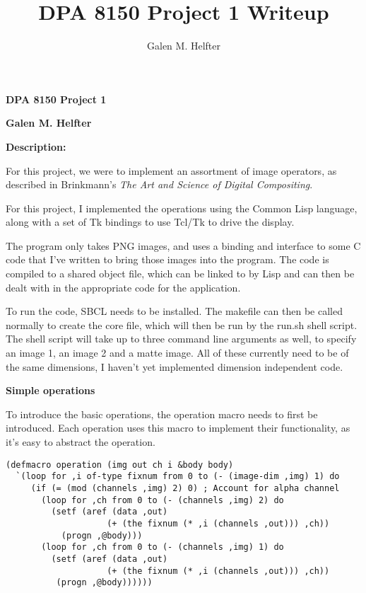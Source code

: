 \documentclass[11pt]{report}
\begin{document}
\title{DPA 8150 Project 1 Writeup}
\author{Galen M. Helfter\\
       }



\centerline{\textbf{DPA 8150 Project 1}}
\centerline{\textbf{Galen M. Helfter}}

\bigskip
\textbf{Description:}

For this project, we were to implement an assortment of image operators, as
described in Brinkmann's {\it The Art and Science of Digital Compositing}.

For this project, I implemented the operations using the Common Lisp
language, along with a set of Tk bindings to use Tcl/Tk to drive the display.

The program only takes PNG images, and uses a binding and interface to some
C code that I've written to bring those images into the program. The code
is compiled to a shared object file, which can be linked to by Lisp and can
then be dealt with in the appropriate code for the application.

To run the code, SBCL needs to be installed. The makefile can then be called
normally to create the core file, which will then be run by the run.sh shell
script. The shell script will take up to three command line arguments as well,
to specify an image 1, an image 2 and a matte image. All of these currently
need to be of the same dimensions, I haven't yet implemented dimension
independent code.

\bigskip
\textbf{Simple operations}

To introduce the basic operations, the operation macro needs to first be
introduced. Each operation uses this macro to implement their functionality,
as it's easy to abstract the operation.

\begin{lstlisting}
(defmacro operation (img out ch i &body body)
  `(loop for ,i of-type fixnum from 0 to (- (image-dim ,img) 1) do
     (if (= (mod (channels ,img) 2) 0) ; Account for alpha channel
       (loop for ,ch from 0 to (- (channels ,img) 2) do
         (setf (aref (data ,out)
                    (+ (the fixnum (* ,i (channels ,out))) ,ch))
           (progn ,@body)))
       (loop for ,ch from 0 to (- (channels ,img) 1) do
         (setf (aref (data ,out)
                    (+ (the fixnum (* ,i (channels ,out))) ,ch))
          (progn ,@body))))))
\end{lstlisting}
\end{document}
